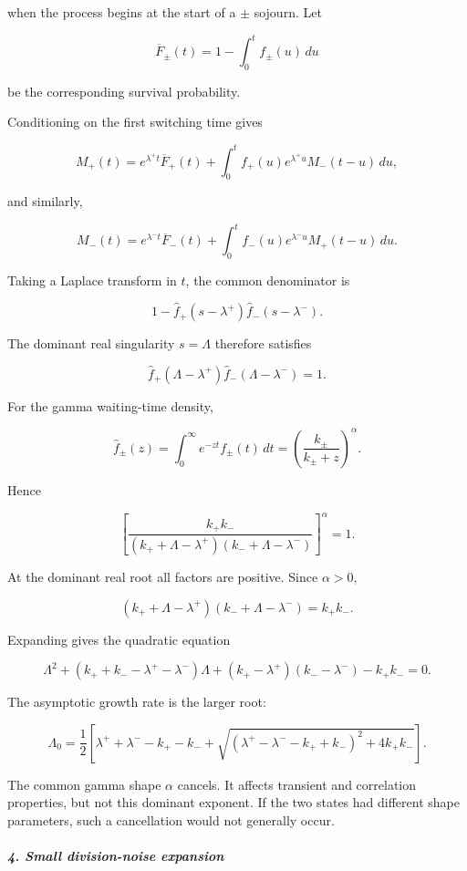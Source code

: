 when the process begins at the start of a $\pm$ sojourn. Let

\[
\overline F_\pm(t)=1-\int_0^t f_\pm(u)\,du
\]

be the corresponding survival probability.

Conditioning on the first switching time gives

\[
M_+(t) = e^{\lambda^+t}\overline F_+(t) + \int_0^t f_+(u)e^{\lambda^+u}M_-(t-u)\,du,
\]

and similarly,

\[
M_-(t) = e^{\lambda^-t}\overline F_-(t) + \int_0^t f_-(u)e^{\lambda^-u}M_+(t-u)\,du.
\]

Taking a Laplace transform in $t$, the common denominator is

\[
1- \widehat f_+(s-\lambda^+) \widehat f_-(s-\lambda^-).
\]

The dominant real singularity $s=\Lambda$ therefore satisfies

\[
\widehat f_+(\Lambda-\lambda^+) \widehat f_-(\Lambda-\lambda^-)=1.
\]

For the gamma waiting-time density,

\[
\widehat f_\pm(z) = \int_0^\infty e^{-zt}f_\pm(t)\,dt = \left(\frac{k_\pm}{k_\pm+z}\right)^\alpha.
\]

Hence

\[
\left[ \frac{k_+k_-} {\left(k_++\Lambda-\lambda^+\right) \left(k_-+\Lambda-\lambda^-\right)} \right]^\alpha =1.
\]

At the dominant real root all factors are positive. Since $\alpha>0$,

\[
\left(k_++\Lambda-\lambda^+\right) \left(k_-+\Lambda-\lambda^-\right) =k_+k_-.
\]

Expanding gives the quadratic equation

\[
\Lambda^2 + \left(k_++k_- -\lambda^+-\lambda^-\right)\Lambda + (k_+-\lambda^+)(k_--\lambda^-)-k_+k_- =0.
\]

The asymptotic growth rate is the larger root:

\[
\Lambda_0 = \frac{1}{2} \left[ \lambda^++\lambda^--k_+-k_- + \sqrt{ \left(\lambda^+-\lambda^- -k_+ +k_-\right)^2 +4k_+k_- } \right].
\]

The common gamma shape $\alpha$ cancels. It affects transient and correlation properties, but not this dominant exponent. If the two states had different shape parameters, such a cancellation would not generally occur.

\subparagraph*{4. Small division-noise expansion}


